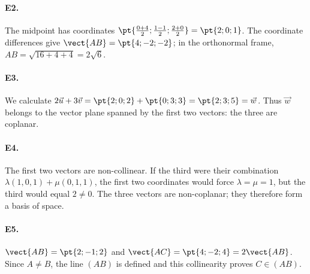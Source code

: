 \paragraph{E2.}The midpoint has coordinates $\pt{\frac{0+4}{2};\frac{1-1}{2};\frac{2+0}{2}}=\pt{2;0;1}$. The coordinate differences give $\vect{AB}=\pt{4;-2;-2}$; in the orthonormal frame, $AB=\sqrt{16+4+4}=2\sqrt6$.

\paragraph{E3.}We calculate $2\vec u+3\vec v=\pt{2;0;2}+\pt{0;3;3}=\pt{2;3;5}=\vec w$. Thus $\vec w$ belongs to the vector plane spanned by the first two vectors: the three are coplanar.

\paragraph{E4.}The first two vectors are non-collinear. If the third were their combination $\lambda(1,0,1)+\mu(0,1,1)$, the first two coordinates would force $\lambda=\mu=1$, but the third would equal $2\ne0$. The three vectors are non-coplanar; they therefore form a basis of space.

\paragraph{E5.}$\vect{AB}=\pt{2;-1;2}$ and $\vect{AC}=\pt{4;-2;4}=2\vect{AB}$. Since $A\ne B$, the line $(AB)$ is defined and this collinearity proves $C\in(AB)$.


